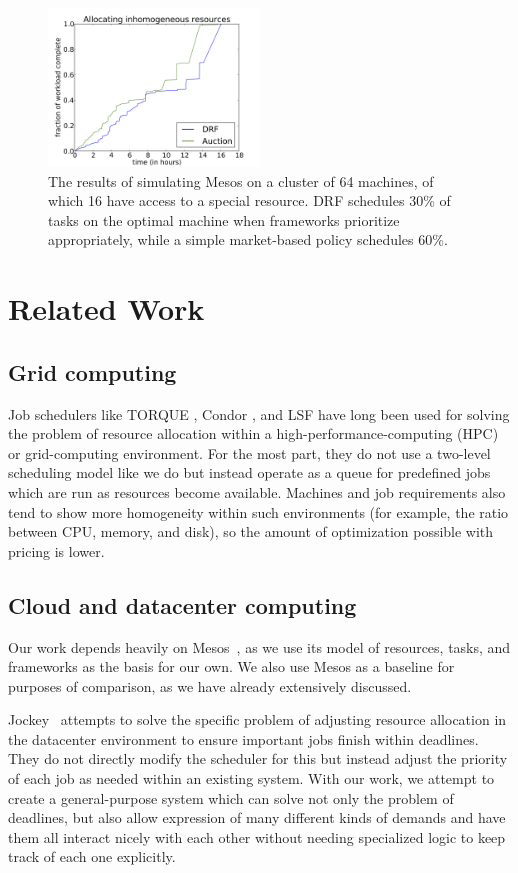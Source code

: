 \documentclass{acm_proc_article-sp}
\begin{document}
\begin{figure}
\includegraphics[width=0.5\textwidth]{images/inhomo_times.png}
\caption{The results of simulating Mesos on a cluster of 64 machines, of which 16 have access to a special resource. DRF schedules 30\% of tasks on the optimal machine when frameworks prioritize appropriately, while a simple market-based policy schedules 60\%.}
\label{img:inhomo}
\end{figure}


\section{Related Work}
\label{sec:related}

\subsection{Grid computing}
Job schedulers like TORQUE \cite{torque}, Condor \cite{condor}, and LSF
\cite{lsf} have long been used for solving the problem of resource allocation
within a high-performance-computing (HPC) or grid-computing environment.
For the most part, they do not use a two-level scheduling model like we do but
instead operate as a queue for predefined jobs which are run as resources become
available. Machines and job requirements also tend to show more homogeneity
within such environments (for example, the ratio between CPU, memory, and disk),
so the amount of optimization possible with pricing is lower.

\subsection{Cloud and datacenter computing}
Our work depends heavily on Mesos~\cite{mesos}, as we use its model of
resources, tasks, and frameworks as the basis for our own. We also use Mesos as
a baseline for purposes of comparison, as we have already extensively discussed.

Jockey~\cite{jockey} attempts to solve the specific problem of adjusting
resource allocation in the datacenter environment to ensure important jobs
finish within deadlines. They do not directly modify the scheduler for this but
instead adjust the priority of each job as needed within an existing system.
With our work, we attempt to create a general-purpose system which can solve not
only the problem of deadlines, but also allow expression of many different kinds
of demands and have them all interact nicely with each other without needing
specialized logic to keep track of each one explicitly.
\end{document}
